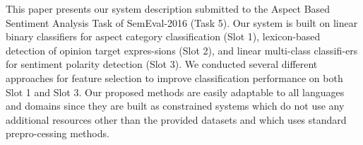 This paper presents our system description submitted to the Aspect Based Sentiment Analysis Task of SemEval-2016 (Task 5). Our system is built on linear binary classifiers for aspect category classification (Slot 1), lexicon-based detection of opinion target expres-sions (Slot 2), and linear multi-class classifi-ers for sentiment polarity detection (Slot 3). We conducted several different approaches for feature selection to improve classification performance on both Slot 1 and Slot 3. Our proposed methods are easily adaptable to all languages and domains since they are built as constrained systems which do not use any additional resources other than the provided datasets and which uses standard prepro-cessing methods.
